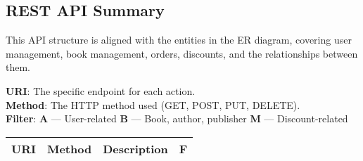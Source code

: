 \subsection{REST API Summary}

This API structure is aligned with the entities in the ER diagram, covering user management, book management, orders, discounts, and the relationships between them.

\textbf{URI}: The specific endpoint for each action. \\
\textbf{Method}: The HTTP method used (GET, POST, PUT, DELETE). \\
\textbf{Filter}: \textbf{A} — User-related \quad \textbf{B} — Book, author, publisher \quad \textbf{M} — Discount-related

\begin{longtable}{|p{}|p{} |p{}|p{}|} 
\hline
\textbf{URI} & \textbf{Method} & \textbf{Description} & \textbf{F} 
\\\hline


\end{longtable}
